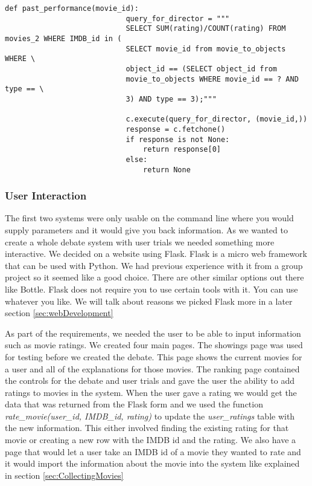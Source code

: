                     \begin{lstlisting}[gobble=20, tabsize=4,  caption=Code used to get the past performance of the movies of a director,label=fig:past_performance]
                        def past_performance(movie_id):
                            query_for_director = """
                            SELECT SUM(rating)/COUNT(rating) FROM movies_2 WHERE IMDB_id in (
                            SELECT movie_id from movie_to_objects WHERE \
                            object_id == (SELECT object_id from
                            movie_to_objects WHERE movie_id == ? AND type == \
                            3) AND type == 3);"""
                            
                            c.execute(query_for_director, (movie_id,))
                            response = c.fetchone()
                            if response is not None:
                                return response[0]
                            else:
                                return None
                    \end{lstlisting}

            \subsubsection{User Interaction}

                The first two systems were only usable on the command line where you would supply parameters and it would give you back information. As we wanted to create a whole debate system with user trials we needed something more interactive. We decided on a website using Flask. Flask is a micro web framework that can be used with Python. We had previous experience with it from a group project so it seemed like a good choice. There are other similar options out there like Bottle. Flask does not require you to use certain tools with it. You can use whatever you like. We will talk about reasons we picked Flask more in a later section \ref{sec:webDevelopment}
                
                As part of the requirements, we needed the user to be able to input information such as movie ratings. We created four main pages. 
                The showings page was used for testing before we created the debate. This page shows the current movies for a user and all of the explanations for those movies. The ranking page contained the controls for the debate and user trials and gave the user the ability to add ratings to movies in the system. When the user gave a rating we would get the data that was returned from the Flask form and we used the function \textit{rate\_movie(user\_id, IMDB\_id, rating)} to update the \textit{user\_ratings} table with the new information. This either involved finding the existing rating for that movie or creating a new row with the IMDB id and the rating. We also have a page that would let a user take an IMDB id of a movie they wanted to rate and it would import the information about the movie into the system like explained in section \ref{sec:CollectingMovies} 
                
